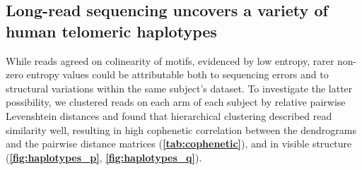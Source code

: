 \documentclass{article}
\begin{document}
\subsection*{Long-read sequencing uncovers a variety of human telomeric haplotypes}
    While reads agreed on colinearity of motifs, evidenced by low entropy,
        rarer non-zero entropy values could be attributable both to sequencing errors
        and to structural variations within the same subject's dataset.
    To investigate the latter possibility,
        we clustered reads on each arm of each subject by relative pairwise Levenshtein distances \parencite{levenshtein}
        and found that hierarchical clustering described read similarity well,
            resulting in high cophenetic correlation between the dendrograms and the pairwise distance matrices
                (\textbf{\autoref{tab:cophenetic}}),
            and in visible structure (\textbf{\autoref{fig:haplotypes_p}}, \textbf{\autoref{fig:haplotypes_q}}).
\end{document}
